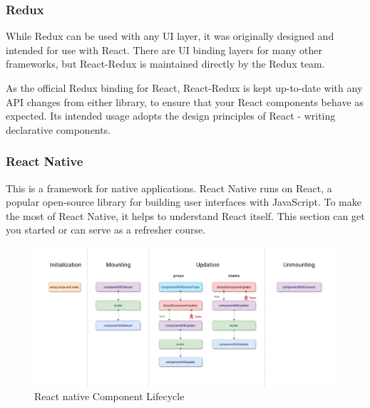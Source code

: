 \begin{flushleft}
\subsubsection{Redux}
While Redux can be used with any UI layer, it was originally designed and intended for use with React. There are UI binding layers for many other frameworks, but React-Redux is maintained directly by the Redux team.

As the official Redux binding for React, React-Redux is kept up-to-date with any API changes from either library, to ensure that your React components behave as expected. Its intended usage adopts the design principles of React - writing declarative components.

\subsubsection{React Native}
This is a framework for native applications. React Native runs on React, a popular open-source library for building user interfaces with JavaScript. To make the most of React Native, it helps to understand React itself. This section can get you started or can serve as a refresher course.

 \begin{figure}[htbp]
\centerline{\includegraphics[scale=0.3]{Figures/component.png}}
\caption{React native Component Lifecycle}
\label{fig}
\end{figure}



\end{flushleft}
